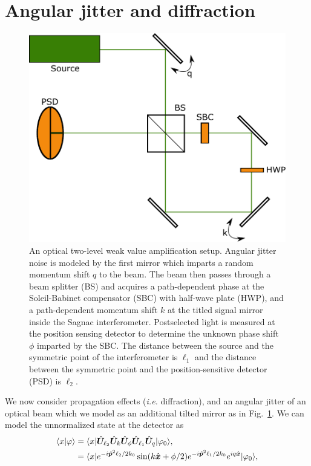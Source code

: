 \section{Angular jitter and diffraction}\label{sec:jitter}
\begin{figure}
	\includegraphics[scale=.6]{InverseWeakValueNoise/Figures/jitter_setup.pdf}
	\caption{An optical two-level weak value amplification setup.  Angular jitter noise is modeled by the first mirror which imparts a random momentum shift $q$ to the beam.  The beam then passes through a beam splitter (BS) and acquires a path-dependent phase at the Soleil-Babinet compensator (SBC) with half-wave plate (HWP), and a path-dependent momentum shift $k$ at the titled signal mirror inside the Sagnac interferometer.  Postselected light is measured at the position sensing detector to determine the unknown phase shift $\phi$ imparted by the SBC.  The distance between the source and the symmetric point of the interferometer is $\ell_1$ and the distance between the symmetric point and the position-sensitive detector (PSD) is $\ell_2$.}\label{fig:jitter setup}
\end{figure}
We now consider propagation effects (\emph{i.e.} diffraction), and an angular jitter of an optical beam which we model as an additional tilted mirror as in Fig.~\ref{fig:jitter setup}.  We can model the unnormalized state at the detector as 
\begin{align}\label{eq:jitter state}
	\langle x \vert \varphi \rangle &= \langle x \rvert\hat{\bm U}_{\ell_2} \hat{\bm U}_{k} \hat{\bm U}_\phi \hat{\bm U}_{\ell_1} \hat{\bm U}_q \lvert \varphi_0\rangle,\nonumber \\
	&= \langle x \rvert e^{-i\hat{\bm p}^2\ell_2/2k_0}\sin(k\hat{\bm x} + \phi/2)e^{-i\hat{\bm p}^2\ell_1/2k_0}e^{iq\hat{\bm x}}\lvert \varphi_0\rangle,
\end{align}
